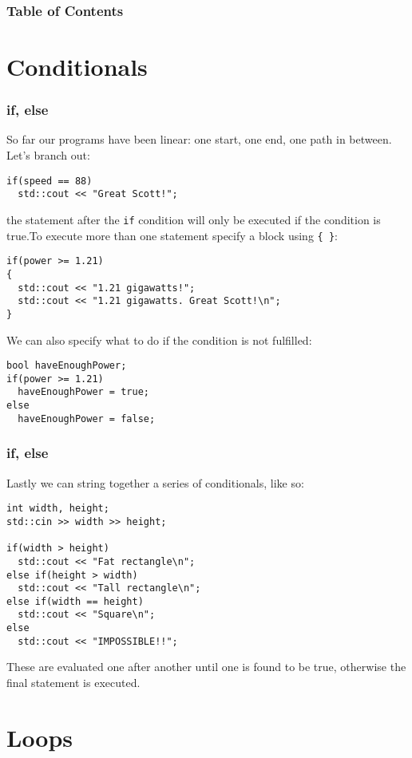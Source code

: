 \documentclass{beamer}
\subtitle{Session 1: Control structure}
\begin{document}
\frame{\titlepage}

\begin{frame}
\frametitle{Table of Contents}
\tableofcontents
\end{frame}

\section{Conditionals}

\begin{frame}[fragile]
	\frametitle{if, else}
	So far our programs have been linear: one start, one end, one path in between.  Let's branch out:
	\pause
	\begin{lstlisting}
if(speed == 88)
  std::cout << "Great Scott!";
	\end{lstlisting}
	the statement after the \texttt{if} condition will only be executed if the condition is true.\pause  To execute more than one statement specify a block using \texttt{\{ \}}:
	\begin{lstlisting}
if(power >= 1.21)
{
  std::cout << "1.21 gigawatts!";
  std::cout << "1.21 gigawatts. Great Scott!\n";
}
	\end{lstlisting} 
	\pause
	We can also specify what to do if the condition is not fulfilled:
	\begin{lstlisting}
bool haveEnoughPower;
if(power >= 1.21)
  haveEnoughPower = true;
else
  haveEnoughPower = false;	
	\end{lstlisting}
\end{frame}



\begin{frame}[fragile]
  \frametitle{if, else}
  Lastly we can string together a series of conditionals, like so:
	\begin{lstlisting}
int width, height;
std::cin >> width >> height;
	
if(width > height)
  std::cout << "Fat rectangle\n";
else if(height > width)
  std::cout << "Tall rectangle\n";
else if(width == height)
  std::cout << "Square\n";
else
  std::cout << "IMPOSSIBLE!!";
	\end{lstlisting}
	These are evaluated one after another until one is found to be true, otherwise the final  statement is executed.
	\pause
\end{frame}

\section{Loops}
\end{document}

